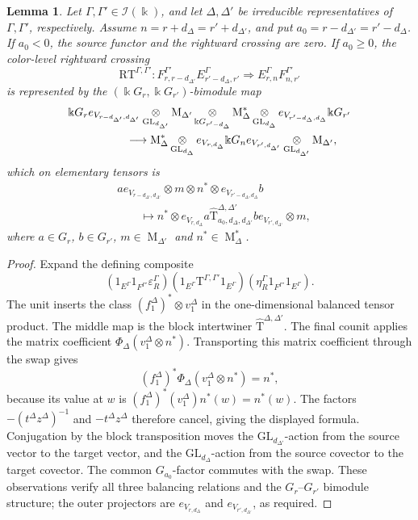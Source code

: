 \documentclass[12pt]{amsart}
\numberwithin{itemcounter}{subsection}
\theoremstyle{plain}
\newtheorem{lemma}[theorem]{Lemma}
\theoremstyle{definition}
\theoremstyle{remark}
\numberwithin{equation}{section}
\def\k{\Bbbk}
\def\calI{\mathcal{I}}
\def\GL{\mathrm{GL}}
\def\M{{\operatorname{M}\nolimits}}
\def\Rcross{\mathrm{RT}}
\DeclareMathOperator*{\ot}{\otimes}
\begin{document}
\begin{lemma}\label{lcross}
Let \(\Gamma,\Gamma'\in\calI(\k)\), and let \(\Delta,\Delta'\) be irreducible representatives of \(\Gamma,\Gamma'\), respectively.  Assume
\(n=r+d_\Delta=r'+d_{\Delta'}\), and put
\(a_0=r-d_{\Delta'}=r'-d_\Delta\).  If \(a_0<0\), the source functor
and the rightward crossing are zero.  If \(a_0\ge0\), the color-level rightward crossing
\[
\Rcross^{\Gamma,\Gamma'}:
F^{\Gamma'}_{r,r-d_{\Delta'}}E^\Gamma_{r'-d_\Delta,r'}
\Longrightarrow
E^\Gamma_{r,n}F^{\Gamma'}_{n,r'}
\]
is represented by the \((\k G_r,\k G_{r'})\)-bimodule map
\begin{align*}
&\k G_r e_{V_{r-d_{\Delta'},d_{\Delta'}}}
 \ot_{\GL_{d_{\Delta'}}}\M_{\Delta'}
 \ot_{\k G_{r'-d_\Delta}}
 \M_\Delta^*\ot_{\GL_{d_\Delta}}
 e_{V_{r'-d_\Delta,d_\Delta}}\k G_{r'}\\
&\hspace{18mm}\longrightarrow
\M_\Delta^*\ot_{\GL_{d_\Delta}}e_{V_{r,d_\Delta}}
 \k G_n e_{V_{r',d_{\Delta'}}}
 \ot_{\GL_{d_{\Delta'}}}\M_{\Delta'},
\end{align*}
which on elementary tensors is
\begin{align*}
&a e_{V_{r-d_{\Delta'},d_{\Delta'}}}\otimes m\otimes n^*
 \otimes e_{V_{r'-d_\Delta,d_\Delta}}b\\
&\qquad\longmapsto
n^*\otimes e_{V_{r,d_\Delta}}
 a\widehat{\mathrm{T}}^{\Delta,\Delta'}_{a_0,d_\Delta,d_{\Delta'}}
 b e_{V_{r',d_{\Delta'}}}\otimes m,
\end{align*}
where \(a\in G_r\), \(b\in G_{r'}\),
\(m\in\M_{\Delta'}\) and \(n^*\in\M_\Delta^*\).
\end{lemma}

\begin{proof}
Expand the defining composite
\[
(1_{E^\Gamma}1_{F^{\Gamma'}}\varepsilon_R^\Gamma)
(1_{E^\Gamma}\mathrm{T}^{\Gamma,\Gamma'}1_{E^\Gamma})
(\eta_R^\Gamma1_{F^{\Gamma'}}1_{E^\Gamma}).
\]
The unit inserts the class \((f_1^\Delta)^*\otimes v_1^\Delta\) in the
one-dimensional balanced tensor product.  The middle map is the block
intertwiner \(\widehat{\mathrm T}^{\Delta,\Delta'}\).  The final counit applies the matrix coefficient
\(\Phi_\Delta(v_1^\Delta\otimes n^*)\).
Transporting this matrix coefficient through the swap gives
\[
 (f_1^\Delta)^*\Phi_\Delta(v_1^\Delta\otimes n^*)=n^*,
\]
because its value at \(w\) is
\((f_1^\Delta)^*(v_1^\Delta)n^*(w)=n^*(w)\).
The factors \(-(t^\Delta z^\Delta)^{-1}\) and \(-t^\Delta z^\Delta\)
therefore cancel, giving the displayed formula.
Conjugation by the block transposition moves the \(\GL_{d_{\Delta'}}\)-action from the source vector to the target vector, and the \(\GL_{d_\Delta}\)-action from the source covector to the target covector.
The common \(G_{a_0}\)-factor commutes with the swap.  These observations
verify all three balancing relations and the \(G_r\)--\(G_{r'}\)
bimodule structure; the outer projectors are
\(e_{V_{r,d_\Delta}}\) and \(e_{V_{r',d_{\Delta'}}}\), as required.
\end{proof}
\end{document}
